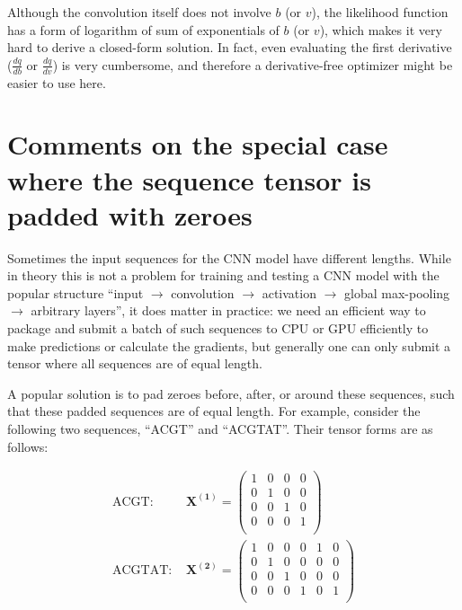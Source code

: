 \documentclass[12pt]{article}
\newcommand{\matrixSymbol}[1]{\mathbf{#1}}
\begin{document}
Although the convolution itself does not involve $b$ (or $v$), the likelihood function has a form of logarithm of sum of exponentials of $b$ (or $v$), which makes it very hard to derive a closed-form solution. In fact, even evaluating the first derivative ($\frac{dq}{db}$ or $\frac{dq}{dv}$) is very cumbersome, and therefore a derivative-free optimizer might be easier to use here.


\section{Comments on the special case where the sequence tensor is padded with zeroes}

Sometimes the input sequences for the CNN model have different lengths. While in theory this is not a problem for training and testing a CNN model with the popular structure ``input $\rightarrow$ convolution $\rightarrow$ activation $\rightarrow$ global max-pooling $\rightarrow$ arbitrary layers'', it does matter in practice: we need an efficient way to package and submit a batch of such sequences to CPU or GPU efficiently to make predictions or calculate the gradients, but generally one can only submit a tensor where all sequences are of equal length. 

A popular solution is to pad zeroes before, after, or around these sequences, such that these padded sequences are of equal length. For example, consider the following two sequences, ``ACGT'' and ``ACGTAT''. Their tensor forms are as follows:

\begin{align}
\text{ACGT: } & \matrixSymbol{X^{(1)}} = \left( \begin{smallmatrix} 
  1 & 0 & 0 & 0 \\  
  0 & 1 & 0 & 0 \\ 
  0 & 0 & 1 & 0 \\ 
  0 & 0 & 0 & 1 \\ 
\end{smallmatrix} \right) \\
\text{ACGTAT: } & \matrixSymbol{X^{(2)}} = \left( \begin{smallmatrix} 
  1 & 0 & 0 & 0 & 1 & 0 \\  
  0 & 1 & 0 & 0 & 0 & 0 \\ 
  0 & 0 & 1 & 0 & 0 & 0 \\ 
  0 & 0 & 0 & 1 & 0 & 1 \\ 
\end{smallmatrix} \right)
\end{align} 
\end{document}

